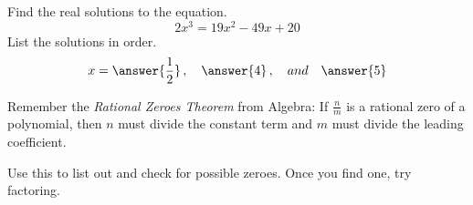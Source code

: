 \documentclass{ximera}
\author{Carl Stitz \and Jeff Zeager \and Bobby Ramsey}
\begin{document}
\begin{exercise}
	Find the real solutions to the equation.
	\[ 2x^3 = 19x^2 - 49 x + 20 \]
	List the solutions in order.
	\[ x = \answer{\frac{1}{2}} \, , \quad  \answer{4}\, , \quad and \quad \answer{5} \]
	\begin{feedback}
		Remember the \emph{Rational Zeroes Theorem} from Algebra: If $\frac{n}{m}$ is a rational zero of a polynomial, then
		$n$ must divide the constant term and $m$ must divide the leading coefficient.  
		
		Use this to list out and check for possible zeroes.  Once you find one, try factoring.
	\end{feedback}
\end{exercise}
\end{document}
